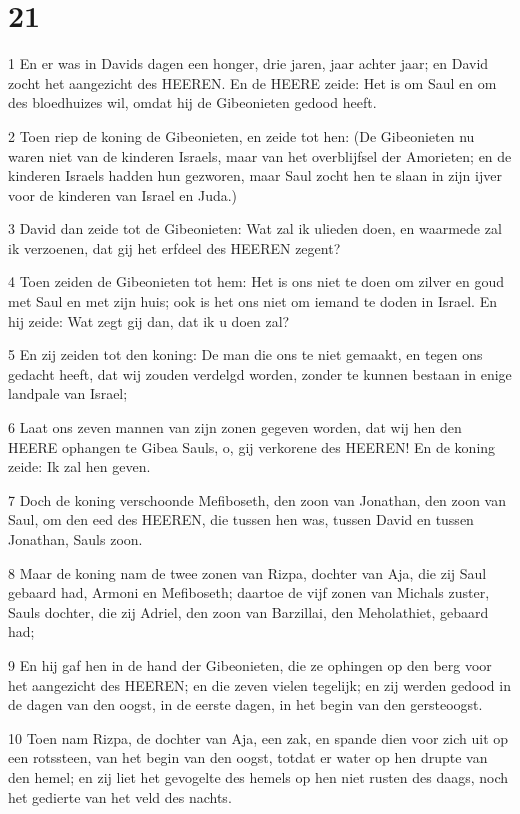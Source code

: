 \chapter{21}

\par 1 En er was in Davids dagen een honger, drie jaren, jaar achter jaar; en David zocht het aangezicht des HEEREN. En de HEERE zeide: Het is om Saul en om des bloedhuizes wil, omdat hij de Gibeonieten gedood heeft.
\par 2 Toen riep de koning de Gibeonieten, en zeide tot hen: (De Gibeonieten nu waren niet van de kinderen Israels, maar van het overblijfsel der Amorieten; en de kinderen Israels hadden hun gezworen, maar Saul zocht hen te slaan in zijn ijver voor de kinderen van Israel en Juda.)
\par 3 David dan zeide tot de Gibeonieten: Wat zal ik ulieden doen, en waarmede zal ik verzoenen, dat gij het erfdeel des HEEREN zegent?
\par 4 Toen zeiden de Gibeonieten tot hem: Het is ons niet te doen om zilver en goud met Saul en met zijn huis; ook is het ons niet om iemand te doden in Israel. En hij zeide: Wat zegt gij dan, dat ik u doen zal?
\par 5 En zij zeiden tot den koning: De man die ons te niet gemaakt, en tegen ons gedacht heeft, dat wij zouden verdelgd worden, zonder te kunnen bestaan in enige landpale van Israel;
\par 6 Laat ons zeven mannen van zijn zonen gegeven worden, dat wij hen den HEERE ophangen te Gibea Sauls, o, gij verkorene des HEEREN! En de koning zeide: Ik zal hen geven.
\par 7 Doch de koning verschoonde Mefiboseth, den zoon van Jonathan, den zoon van Saul, om den eed des HEEREN, die tussen hen was, tussen David en tussen Jonathan, Sauls zoon.
\par 8 Maar de koning nam de twee zonen van Rizpa, dochter van Aja, die zij Saul gebaard had, Armoni en Mefiboseth; daartoe de vijf zonen van Michals zuster, Sauls dochter, die zij Adriel, den zoon van Barzillai, den Meholathiet, gebaard had;
\par 9 En hij gaf hen in de hand der Gibeonieten, die ze ophingen op den berg voor het aangezicht des HEEREN; en die zeven vielen tegelijk; en zij werden gedood in de dagen van den oogst, in de eerste dagen, in het begin van den gersteoogst.
\par 10 Toen nam Rizpa, de dochter van Aja, een zak, en spande dien voor zich uit op een rotssteen, van het begin van den oogst, totdat er water op hen drupte van den hemel; en zij liet het gevogelte des hemels op hen niet rusten des daags, noch het gedierte van het veld des nachts.
